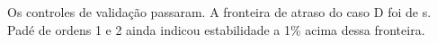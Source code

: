 Os \ChecksPass{} controles de validação passaram. A fronteira de
atraso do caso D foi de \DelayCritical{} s. Padé de ordens 1 e 2
ainda indicou estabilidade a 1\% acima dessa fronteira.
